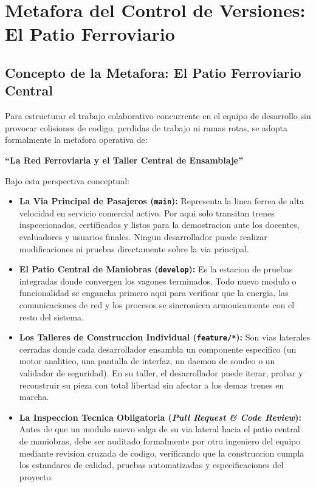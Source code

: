 \documentclass[12pt,a4paper]{report}
\begin{document}
\tableofcontents
\newpage

\listoftables
\newpage

\chapter{Metafora del Control de Versiones: El Patio Ferroviario}

\section{Concepto de la Metafora: El Patio Ferroviario Central}
Para estructurar el trabajo colaborativo concurrente en el equipo de desarrollo sin provocar colisiones de codigo, perdidas de trabajo ni ramas rotas, se adopta formalmente la metafora operativa de:
\begin{center}
  \textbf{\large ``La Red Ferroviaria y el Taller Central de Ensamblaje''}
\end{center}

Bajo esta perspectiva conceptual:
\begin{itemize}
  \item \textbf{La Via Principal de Pasajeros (\texttt{main}):} Representa la linea ferrea de alta velocidad en servicio comercial activo. Por aqui solo transitan trenes inspeccionados, certificados y listos para la demostracion ante los docentes, evaluadores y usuarios finales. Ningun desarrollador puede realizar modificaciones ni pruebas directamente sobre la via principal.
  \item \textbf{El Patio Central de Maniobras (\texttt{develop}):} Es la estacion de pruebas integradas donde convergen los vagones terminados. Todo nuevo modulo o funcionalidad se engancha primero aqui para verificar que la energia, las comunicaciones de red y los procesos se sincronicen armonicamente con el resto del sistema.
  \item \textbf{Los Talleres de Construccion Individual (\texttt{feature/*}):} Son vias laterales cerradas donde cada desarrollador ensambla un componente especifico (un motor analitico, una pantalla de interfaz, un daemon de sondeo o un validador de seguridad). En su taller, el desarrollador puede iterar, probar y reconstruir su pieza con total libertad sin afectar a los demas trenes en marcha.
  \item \textbf{La Inspeccion Tecnica Obligatoria (\textit{Pull Request \& Code Review}):} Antes de que un modulo nuevo salga de su via lateral hacia el patio central de maniobras, debe ser auditado formalmente por otro ingeniero del equipo mediante revision cruzada de codigo, verificando que la construccion cumpla los estandares de calidad, pruebas automatizadas y especificaciones del proyecto.
\end{itemize}
\end{document}
